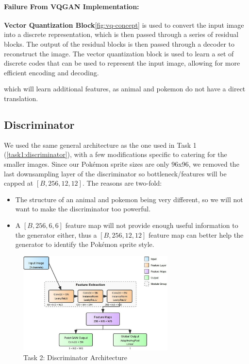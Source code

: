 \documentclass[twoside,english,notitlepage]{report}
\begin{document}
\paragraph{Failure From VQGAN Implementation:} 

\textbf{Vector Quantization Block}\ref{fig:vq-concept} is used to convert the input image into a discrete representation, which is then passed through a series of residual blocks. The output of the residual blocks is then passed through a decoder to reconstruct the image. The vector quantization block is used to learn a set of discrete codes that can be used to represent the input image, allowing for more efficient encoding and decoding. 

which will learn additional features, as animal and pokemon do not have a direct translation.



\subsection{Discriminator}\label{task2:discriminator}
We used the same general architecture as the one used in Task 1 (\ref{task1:discriminator}), with a few modifications specific to catering for the smaller images. Since our Pokémon sprite sizes are only 96x96, we removed the last downsampling layer of the discriminator so bottleneck/features will be capped at $[B, 256, 12, 12]$.
\noindent The reasons are two-fold: 

\begin{itemize}
    \item The structure of an animal and pokemon being very different, so we will not want to make the discriminator too powerful. 
    \item A $[B, 256, 6, 6]$ feature map will not provide enough useful information to the generator either, thus a $[B, 256, 12, 12]$ feature map can better help the generator to identify the Pokémon sprite style.
\end{itemize}


\begin{figure}[h]
    \centering
    \includegraphics[width=0.7\textwidth]{task2/discriminatorArchitecture.jpg}
    \caption{Task 2: Discriminator Architecture}
\end{figure}
\end{document}
